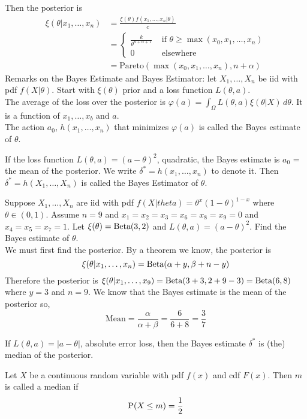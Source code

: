 \documentclass[12pt]{article}
\begin{document}
Then the posterior is $$ \begin{aligned} 
\xi(\theta| x_1,\dots,x_n) &= \frac{\xi(\theta)f(x_1,\dots,x_n|\theta)}{c} \\ &=  \begin{cases} \frac{k}{\theta^{n + \alpha + 1}} &\text{ if } \theta \geq \max(x_0,x_1,\dots,x_n) \\ 0 &\text{ elsewhere} \end{cases} \\ 
&= \text{Pareto}(\max(x_0,x_1,\dots,x_n), n + \alpha) \end{aligned} $$ 
Remarks on the Bayes Estimate and Bayes Estimator: let $X_1,\dots, X_n$ be iid with pdf $f(X|\theta)$. Start with $\xi(\theta)$ prior and a loss function $L(\theta,a)$. \\
The average of the loss over the posterior is $\varphi(a) = \int_\Omega L(\theta,a) \xi(\theta | X) \, d\theta$. It is a function of $x_1,\dots,x_b$ and $a$. \\
The action $a_0$, $h(x_1,\dots,x_n)$ that minimizes $\varphi(a)$ is called the Bayes estimate of $\theta$. 
\begin{theorem} If the loss function $L(\theta,a) = (a - \theta)^2$, quadratic, the Bayes estimate is $a_0$ = the mean of the posterior. We write $\delta^* = h(x_1,\dots,x_n)$ to denote it. Then $\delta^* = h(X_1,\dots,X_n)$ is called the Bayes Estimator of $\theta$. \end{theorem} 
Suppose $X_1,\dots,X_n$ are iid with pdf $f(X|theta) = \theta^x(1-\theta)^{1-x}$ where $\theta \in (0,1)$. Assume $n=9$ and $x_1=  x_2 = x_3 = x_6 = x_8 = x_9 = 0$ and $x_4 = x_5 = x_7 = 1$. Let $\xi(\theta) = \text{Beta}( 3,2 )$ and $L(\theta,a) = (a-\theta)^2$. Find the Bayes estimate of $\theta$. \\ 
We must first find the posterior. By a theorem we know, the posterior is 
$$ \xi(\theta | x_1,\dots,x_n) = \text{Beta}( \alpha + y, \beta + n - y )$$ 
Therefore the posterior is $\xi(\theta | x_1,\dots, x_9) = \text{Beta}( 3+3,2+9-3 ) = \text{Beta}( 6,8 ) $ where $y = 3$ and $n = 9$. We know that the Bayes estimate is the mean of the posterior so, $$ \text{Mean} = \frac{\alpha}{\alpha + \beta} = \frac{6}{6+8} = \frac{3}{7} $$ 
\begin{theorem} If $L(\theta ,a) = |a - \theta|$, absolute error loss, then the Bayes estimate $\delta^*$ is (the) median of the posterior. \end{theorem} 
Let $X$ be a continuous random variable with pdf $f(x)$ and cdf $F(x)$. Then $m $ is called a median if $$\mathrm{P}( X \leq m ) = \frac{1}{2}$$ 
\end{document}
